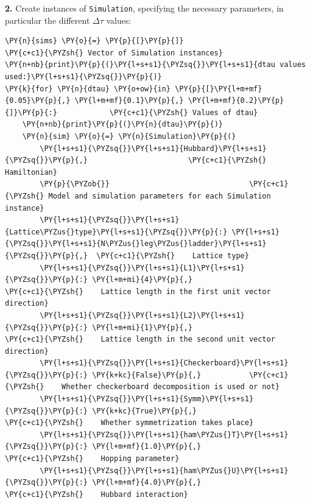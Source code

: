     \textbf{2.} Create instances of \texttt{Simulation}, specifying the
necessary parameters, in particular the different \(\Delta \tau\)
values:

    \begin{tcolorbox}[breakable, size=fbox, boxrule=1pt, pad at break*=1mm,colback=cellbackground, colframe=cellborder]
\begin{Verbatim}[commandchars=\\\{\}]
\PY{n}{sims} \PY{o}{=} \PY{p}{[}\PY{p}{]}                                \PY{c+c1}{\PYZsh{} Vector of Simulation instances}
\PY{n+nb}{print}\PY{p}{(}\PY{l+s+s1}{\PYZsq{}}\PY{l+s+s1}{dtau values used:}\PY{l+s+s1}{\PYZsq{}}\PY{p}{)}
\PY{k}{for} \PY{n}{dtau} \PY{o+ow}{in} \PY{p}{[}\PY{l+m+mf}{0.05}\PY{p}{,} \PY{l+m+mf}{0.1}\PY{p}{,} \PY{l+m+mf}{0.2}\PY{p}{]}\PY{p}{:}            \PY{c+c1}{\PYZsh{} Values of dtau}
    \PY{n+nb}{print}\PY{p}{(}\PY{n}{dtau}\PY{p}{)}
    \PY{n}{sim} \PY{o}{=} \PY{n}{Simulation}\PY{p}{(}
        \PY{l+s+s1}{\PYZsq{}}\PY{l+s+s1}{Hubbard}\PY{l+s+s1}{\PYZsq{}}\PY{p}{,}                       \PY{c+c1}{\PYZsh{} Hamiltonian}
        \PY{p}{\PYZob{}}                                \PY{c+c1}{\PYZsh{} Model and simulation parameters for each Simulation instance}
        \PY{l+s+s1}{\PYZsq{}}\PY{l+s+s1}{Lattice\PYZus{}type}\PY{l+s+s1}{\PYZsq{}}\PY{p}{:} \PY{l+s+s1}{\PYZsq{}}\PY{l+s+s1}{N\PYZus{}leg\PYZus{}ladder}\PY{l+s+s1}{\PYZsq{}}\PY{p}{,}  \PY{c+c1}{\PYZsh{}    Lattice type}
        \PY{l+s+s1}{\PYZsq{}}\PY{l+s+s1}{L1}\PY{l+s+s1}{\PYZsq{}}\PY{p}{:} \PY{l+m+mi}{4}\PY{p}{,}                         \PY{c+c1}{\PYZsh{}    Lattice length in the first unit vector direction}
        \PY{l+s+s1}{\PYZsq{}}\PY{l+s+s1}{L2}\PY{l+s+s1}{\PYZsq{}}\PY{p}{:} \PY{l+m+mi}{1}\PY{p}{,}                         \PY{c+c1}{\PYZsh{}    Lattice length in the second unit vector direction}
        \PY{l+s+s1}{\PYZsq{}}\PY{l+s+s1}{Checkerboard}\PY{l+s+s1}{\PYZsq{}}\PY{p}{:} \PY{k+kc}{False}\PY{p}{,}           \PY{c+c1}{\PYZsh{}    Whether checkerboard decomposition is used or not}
        \PY{l+s+s1}{\PYZsq{}}\PY{l+s+s1}{Symm}\PY{l+s+s1}{\PYZsq{}}\PY{p}{:} \PY{k+kc}{True}\PY{p}{,}                    \PY{c+c1}{\PYZsh{}    Whether symmetrization takes place}
        \PY{l+s+s1}{\PYZsq{}}\PY{l+s+s1}{ham\PYZus{}T}\PY{l+s+s1}{\PYZsq{}}\PY{p}{:} \PY{l+m+mf}{1.0}\PY{p}{,}                    \PY{c+c1}{\PYZsh{}    Hopping parameter}
        \PY{l+s+s1}{\PYZsq{}}\PY{l+s+s1}{ham\PYZus{}U}\PY{l+s+s1}{\PYZsq{}}\PY{p}{:} \PY{l+m+mf}{4.0}\PY{p}{,}                    \PY{c+c1}{\PYZsh{}    Hubbard interaction}

\end{Verbatim}
\end{tcolorbox}
